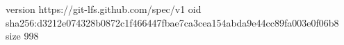 version https://git-lfs.github.com/spec/v1
oid sha256:d3212e074328b0872c1f466447fbae7ca3cea154abda9e44cc89fa003e0f06b8
size 998
